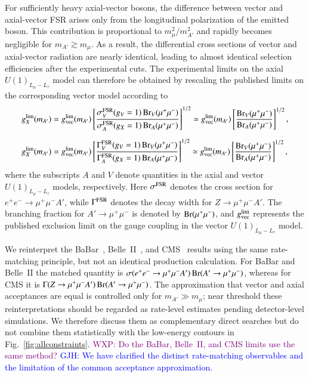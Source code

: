 \documentclass[onecolumn, aps, nofootinbib, prd, preprint, floats, floatfix, amsmath, amssymb, superscriptaddress, preprintnumbers]{revtex4-2}
\newcommand{\GJH}[1]{\textcolor{blue}{GJH: #1}}
\newcommand{\WXP}[1]{\textcolor{purple}{WXP: #1}}
\begin{document}
For sufficiently heavy axial-vector bosons, the difference between vector and axial-vector FSR arises only from the longitudinal polarization of the emitted boson. This contribution is proportional to $m_\mu^2/m_{A'}^2$ and rapidly becomes negligible for $m_{A'}\gtrsim m_\mu$. As a result, the differential cross sections of vector and axial-vector radiation are nearly identical, leading to almost identical selection efficiencies after the experimental cuts. The experimental limits on the axial $U(1)_{L_\mu-L_\tau}$ model can therefore be obtained by rescaling the published limits on the corresponding vector model according to
\begin{equation}
	\begin{aligned}
		g_X^{\rm lim}(m_{A'})
		&=
		g_{\rm vec}^{\rm lim}(m_{A'})
		\left[
		\frac{\sigma_V^{\rm FSR}(g_V=1)\,
			{\rm Br}_V(\mu^+\mu^-)}
		{\sigma_A^{\rm FSR}(g_X=1)\,
			{\rm Br}_A(\mu^+\mu^-)}
		\right]^{1/2}
		\simeq
		g_{\rm vec}^{\rm lim}(m_{A'})
		\left[
		\frac{{\rm Br}_V(\mu^+\mu^-)}
		{{\rm Br}_A(\mu^+\mu^-)}
		\right]^{1/2},
		\\[2mm]
		g_X^{\rm lim}(m_{A'})
		&=
		g_{\rm vec}^{\rm lim}(m_{A'})
		\left[
		\frac{\Gamma_V^{\rm FSR}(g_V=1)\,
			{\rm Br}_V(\mu^+\mu^-)}
		{\Gamma_A^{\rm FSR}(g_X=1)\,
			{\rm Br}_A(\mu^+\mu^-)}
		\right]^{1/2}
		\simeq
		g_{\rm vec}^{\rm lim}(m_{A'})
		\left[
		\frac{{\rm Br}_V(\mu^+\mu^-)}
		{{\rm Br}_A(\mu^+\mu^-)}
		\right]^{1/2},
	\end{aligned}
	\label{eq:four-muon-rescale}
\end{equation}
where the subscripts $A$ and $V$ denote quantities in the axial and vector $U(1)_{L_\mu-L_\tau}$ models, respectively. Here $\sigma^{\rm FSR}$ denotes the cross section for $e^+e^-\rightarrow\mu^+\mu^-A'$, while $\Gamma^{\rm FSR}$ denotes the decay width for $Z\rightarrow\mu^+\mu^-A'$. The branching fraction for $A'\rightarrow\mu^+\mu^-$ is denoted by ${\rm Br}(\mu^+\mu^-)$, and $g_{\rm vec}^{\rm lim}$ represents the published exclusion limit on the gauge coupling in the vector $U(1)_{L_\mu-L_\tau}$ model.

We reinterpret the BaBar~\cite{BaBar:2016sci}, Belle~II~\cite{Belle-II:2024wtd}, and CMS~\cite{CMS:2018yxg} results using the same rate-matching principle, but not an identical production calculation. For BaBar and Belle~II the matched quantity is $\sigma(e^+e^-\to\mu^+\mu^-A')\,{\rm Br}(A'\to\mu^+\mu^-)$, whereas for CMS it is $\Gamma(Z\to\mu^+\mu^-A')\,{\rm Br}(A'\to\mu^+\mu^-)$. The approximation that vector and axial acceptances are equal is controlled only for $m_{A'}\gg m_\mu$; near threshold these reinterpretations should be regarded as rate-level estimates pending detector-level simulations. We therefore discuss them as complementary direct searches but do not combine them statistically with the low-energy contours in Fig.~\ref{fig:allconstraints}.
\WXP{Do the BaBar, Belle~II, and CMS limits use the same method?}
\GJH{We have clarified the distinct rate-matching observables and the limitation of the common acceptance approximation.}
\end{document}
